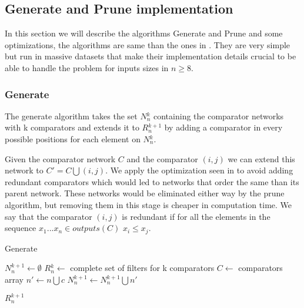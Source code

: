 \documentclass[../main.tex]{subfiles}
\begin{document}
	\subsection{Generate and Prune implementation}
	In this section we will describe the algorithms Generate and Prune and some optimizations, the algorithms are same than the ones in \cite{sortingnineinputs}. They are very simple but run in massive datasets that make their implementation details crucial to be able to handle the problem for inputs sizes in $n \geq 8$.
	
	\subsubsection{Generate}
	The generate algorithm takes the set $N{_n^k}$ containing the comparator networks with k comparators and extends it to $R{_n^{k+1}}$ by adding a comparator in every possible positions for each element on $N{_n^k}$.
	
	 Given the comparator network $C$ and the comparator $(i,j)$ we can extend this network to $C' = C \bigcup (i,j)$. We apply the optimization seen in \cite{sortingnineinputs} to avoid adding redundant comparators which would led to networks that order the same than its parent network. These networks would be eliminated either way by the prune algorithm, but removing them in this stage is cheaper in computation time. We say that the comparator $(i,j)$ is redundant if for all the elements in the sequence $x_1...x_n  \in outputs(C)$ $x_i \leq x_j$.
	
	\begin{algorithm}[H]
	\caption{Generate} 
	\begin{algorithmic}
	\State $N{_n^{k+1}} \leftarrow \emptyset$
	\State $R{_n^k} \leftarrow$ complete set of filters for k comparators
	\State $C \leftarrow$ comparators array
			\State $n' \leftarrow n\bigcup c$
			\State $N{_n^{k+1}} \leftarrow N{_n^{k+1}} \bigcup n'$
			\EndIf
		\EndFor
	\EndFor
	
	\Return $R{_n^{k+1}}$
	\end{algorithmic}
	\end{algorithm}
\end{document}
